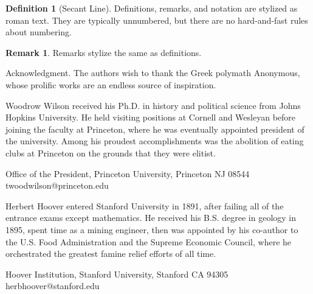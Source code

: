 \documentclass{article}
\theoremstyle{theorem}
\theoremstyle{definition}
\newtheorem*{definition}{Definition}
\newtheorem*{remark}{Remark}
\begin{document}
\begin{definition}[Secant Line]
Definitions, remarks, and notation are stylized as roman text.  They are typically unnumbered, but there are no hard-and-fast rules about numbering.
\end{definition}

\begin{remark}
Remarks stylize the same as definitions.
\end{remark}


\begin{acknowledgment}{Acknowledgment.}
The authors wish to thank the Greek polymath Anonymous, whose prolific works are an endless source of inspiration.
\end{acknowledgment}




%

\begin{biog}
\item[Woodrow Wilson] received his Ph.D. in history and political science from Johns Hopkins University. He held visiting positions at Cornell and Wesleyan before joining the faculty at Princeton, where he was eventually appointed president of the university.  Among his proudest accomplishments was the abolition of eating clubs at Princeton on the grounds that they were elitist.
\begin{affil}
Office of the President, Princeton University, Princeton NJ 08544\\
twoodwilson@princeton.edu
\end{affil}

\item[Herbert Hoover] entered Stanford University in 1891, after failing all of the entrance exams except mathematics.  He received his B.S. degree in geology in 1895, spent time as a mining engineer, then was appointed by his co-author to the U.S. Food Administration and the Supreme Economic Council, where he orchestrated the greatest famine relief efforts of all time.
\begin{affil}
Hoover Institution, Stanford University, Stanford CA 94305\\
herbhoover@stanford.edu
\end{affil}
\end{biog}
\vfill\eject
\end{document}

